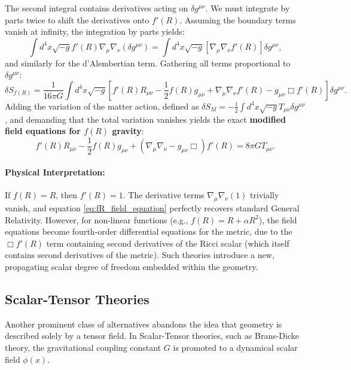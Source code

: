 \documentclass[11pt, a4paper]{report}
\begin{document}
The second integral contains derivatives acting on $\delta g^{\mu\nu}$. We must integrate by parts twice to shift the derivatives onto $f'(R)$. Assuming the boundary terms vanish at infinity, the integration by parts yields:
\begin{equation}
\int d^{4}x \sqrt{-g} f'(R) \nabla_{\mu}\nabla_{\nu} (\delta g^{\mu\nu}) = \int d^{4}x \sqrt{-g} \left[ \nabla_{\mu}\nabla_{\nu} f'(R) \right] \delta g^{\mu\nu},
\end{equation}
and similarly for the d'Alembertian term. Gathering all terms proportional to $\delta g^{\mu\nu}$:
\begin{equation}
\delta S_{f(R)} = \frac{1}{16\pi G} \int d^{4}x \sqrt{-g} \left[ f'(R)R_{\mu\nu} - \frac{1}{2}f(R)g_{\mu\nu} + \nabla_{\mu}\nabla_{\nu}f'(R) - g_{\mu\nu}\Box f'(R) \right] \delta g^{\mu\nu}.
\end{equation}
Adding the variation of the matter action, defined as $\delta S_{M} = -\frac{1}{2}\int d^{4}x \sqrt{-g} T_{\mu\nu} \delta g^{\mu\nu}$, and demanding that the total variation vanishes yields the exact \textbf{modified field equations for $f(R)$ gravity}:
\begin{equation}
\label{eq:fR_field_equation}
f'(R)R_{\mu\nu} - \frac{1}{2}f(R)g_{\mu\nu} + \left( \nabla_{\mu}\nabla_{\nu} - g_{\mu\nu}\Box \right) f'(R) = 8\pi G T_{\mu\nu}.
\end{equation}

\paragraph{Physical Interpretation:} If $f(R) = R$, then $f'(R) = 1$. The derivative terms $\nabla_{\mu}\nabla_{\nu}(1)$ trivially vanish, and equation \eqref{eq:fR_field_equation} perfectly recovers standard General Relativity. However, for non-linear functions (e.g., $f(R) = R + \alpha R^{2}$), the field equations become fourth-order differential equations for the metric, due to the $\Box f'(R)$ term containing second derivatives of the Ricci scalar (which itself contains second derivatives of the metric). Such theories introduce a new, propagating scalar degree of freedom embedded within the geometry.

\subsection{Scalar-Tensor Theories}

Another prominent class of alternatives abandons the idea that geometry is described solely by a tensor field. In Scalar-Tensor theories, such as Brans-Dicke theory, the gravitational coupling constant $G$ is promoted to a dynamical scalar field $\phi(x)$. 
\end{document}
